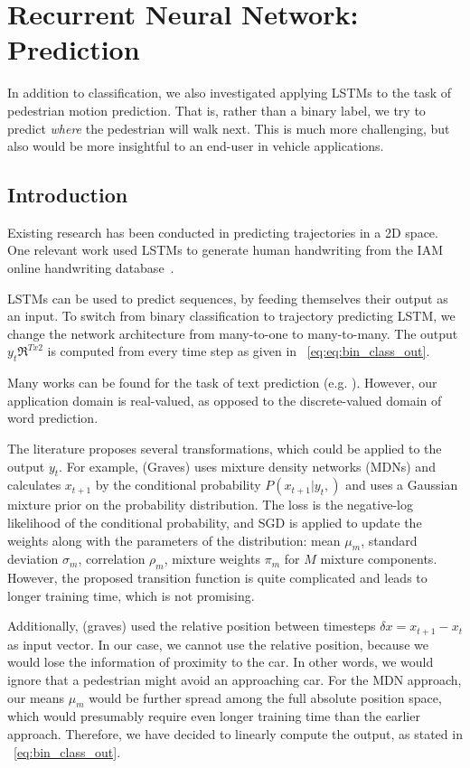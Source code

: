 \section{Recurrent Neural Network: Prediction} \label{sec:rnn_pred}

In addition to classification, we also investigated applying LSTMs to the task of pedestrian motion prediction.
That is, rather than a binary label, we try to predict \textit{where} the pedestrian will walk next.
This is much more challenging, but also would be more insightful to an end-user in vehicle applications.

\subsection{Introduction}
Existing research has been conducted in predicting trajectories in a 2D space. 
One relevant work used LSTMs to generate human handwriting from the IAM online handwriting database~\cite{DBLP:journals/corr/Graves13}.

LSTMs can be used to predict sequences, by feeding themselves their output as an input.
To switch from binary classification to trajectory predicting LSTM, we change the network architecture from many-to-one to many-to-many.
The output $y_t \Re^{Tx2}$ is computed from every time step as given in ~\cref{eq:eq:bin_class_out}.

Many works can be found for the task of text prediction (e.g. \cite{ICML2011Sutskever_524}).
However, our application domain is real-valued, as opposed to the discrete-valued domain of word prediction.

The literature proposes several transformations, which could be applied to the output $y_t$.
For example, (Graves) uses mixture density networks (MDNs) and calculates $x_{t+1}$ by the conditional probability $P(x_{t+1}|y_t, )$ and uses a Gaussian mixture prior on the probability distribution.
The loss is the negative-log likelihood of the conditional probability, and SGD is applied to update the weights along with the parameters of the distribution: mean $\mu_m$, standard deviation $\sigma_m$, correlation $\rho_m$, mixture weights $\pi_m$ for $M$ mixture components.
However, the proposed transition function is quite complicated and leads to longer training time, which is not promising. 

Additionally, (graves) used the relative position between timesteps $\delta x = x_{t+1} - x_t$ as input vector.
In our case, we cannot use the relative position, because we would lose the information of proximity to the car.
In other words, we would ignore that a pedestrian might avoid an approaching car.
For the MDN approach, our means $\mu_m$ would be further spread among the full absolute position space, which would presumably require even longer training time than the earlier approach.
Therefore, we have decided to linearly compute the output, as stated in ~\cref{eq:bin_class_out}. 

